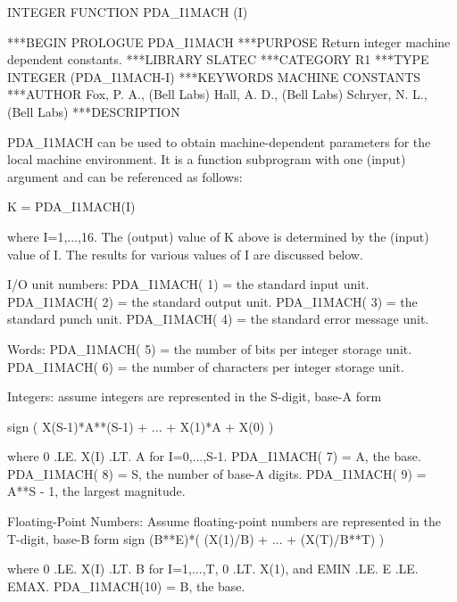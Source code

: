 \documentclass[11pt,twoside,nolof]{starlink}
\begin{document}


\begin{terminalv}
      INTEGER FUNCTION PDA_I1MACH (I)


***BEGIN PROLOGUE  PDA_I1MACH
***PURPOSE  Return integer machine dependent constants.
***LIBRARY   SLATEC
***CATEGORY  R1
***TYPE      INTEGER (PDA_I1MACH-I)
***KEYWORDS  MACHINE CONSTANTS
***AUTHOR  Fox, P. A., (Bell Labs)
           Hall, A. D., (Bell Labs)
           Schryer, N. L., (Bell Labs)
***DESCRIPTION

   PDA_I1MACH can be used to obtain machine-dependent parameters for the
   local machine environment.  It is a function subprogram with one
   (input) argument and can be referenced as follows:

        K = PDA_I1MACH(I)

   where I=1,...,16.  The (output) value of K above is determined by
   the (input) value of I.  The results for various values of I are
   discussed below.

   I/O unit numbers:
     PDA_I1MACH( 1) = the standard input unit.
     PDA_I1MACH( 2) = the standard output unit.
     PDA_I1MACH( 3) = the standard punch unit.
     PDA_I1MACH( 4) = the standard error message unit.

   Words:
     PDA_I1MACH( 5) = the number of bits per integer storage unit.
     PDA_I1MACH( 6) = the number of characters per integer storage unit.

   Integers:
     assume integers are represented in the S-digit, base-A form

                sign ( X(S-1)*A**(S-1) + ... + X(1)*A + X(0) )

                where 0 .LE. X(I) .LT. A for I=0,...,S-1.
     PDA_I1MACH( 7) = A, the base.
     PDA_I1MACH( 8) = S, the number of base-A digits.
     PDA_I1MACH( 9) = A**S - 1, the largest magnitude.

   Floating-Point Numbers:
     Assume floating-point numbers are represented in the T-digit,
     base-B form
                sign (B**E)*( (X(1)/B) + ... + (X(T)/B**T) )

                where 0 .LE. X(I) .LT. B for I=1,...,T,
                0 .LT. X(1), and EMIN .LE. E .LE. EMAX.
     PDA_I1MACH(10) = B, the base.


\end{terminalv}
\end{document}
